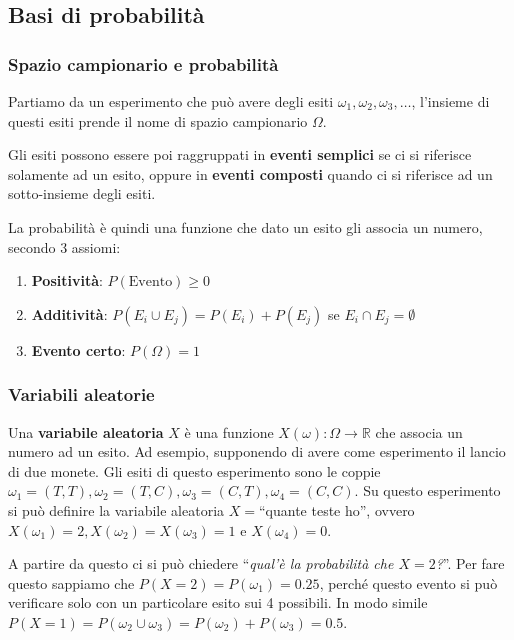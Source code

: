 \subsection{Basi di probabilità}

\subsubsection{Spazio campionario e probabilità}

Partiamo da un esperimento che può avere degli esiti $\omega_1, \omega_2, \omega_3, \ldots$, l'insieme di questi esiti prende il nome di spazio campionario $\Omega$.

Gli esiti possono essere poi raggruppati in \textbf{eventi semplici} se ci si riferisce solamente ad un esito, oppure in \textbf{eventi composti} quando ci si riferisce ad un sotto-insieme degli esiti. 

La probabilità è quindi una funzione che dato un esito gli associa un numero, secondo 3 assiomi:

\begin{enumerate}
	\item \textbf{Positività}: $P(\text{Evento}) \geq 0$
	\item \textbf{Additività}: $P(E_i \cup E_j) = P(E_i) + P(E_j) $ se $E_i \cap E_j = \emptyset$
	\item \textbf{Evento certo}: $P(\Omega) = 1$
\end{enumerate}

\subsubsection{Variabili aleatorie}

Una \textbf{variabile aleatoria} $X$ è una funzione $X(\omega) : \Omega \rightarrow \mathbb{R}$ che associa un numero ad un esito.
Ad esempio, supponendo di avere come esperimento il lancio di due monete. Gli esiti di questo esperimento sono le coppie $\omega_1 = (T,T), \omega_2 = (T,C),\omega_3 = (C,T),\omega_4 = (C,C)$. Su questo esperimento si può definire la variabile aleatoria $X = $``quante teste ho'', ovvero $X(\omega_1) = 2, X(\omega_2) = X(\omega_3) = 1$ e $X(\omega_4) = 0$.

A partire da questo ci si può chiedere ``\textit{qual'è la probabilità che $X = 2$?}''. Per fare questo sappiamo che $P(X = 2) = P(\omega_1) = 0.25$, perché questo evento si può verificare solo con un particolare esito sui 4 possibili.
In modo simile $P(X = 1) = P(\omega_2 \cup \omega_3) = P(\omega_2) + P(\omega_3) = 0.5$.

